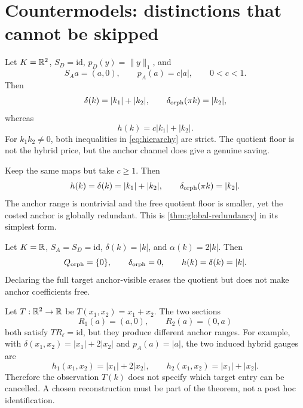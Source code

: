 \section{Countermodels: distinctions that cannot be skipped}
\label{sec:countermodels}

\begin{example}\label{ex:strict}
Let \(K=\mathbb R^2\), \(S_D=\mathrm{id}\), \(p_D(y)=\|y\|_1\), and
\[
 S_Aa=(a,0),
 \qquad
 p_A(a)=c|a|,
 \qquad 0<c<1.
\]
Then
\[
 \delta(k)=|k_1|+|k_2|,
 \qquad
 \delta_{\rm orph}(\pi k)=|k_2|,
\]
whereas
\[
 h(k)=c|k_1|+|k_2|.
\]
For \(k_1k_2\ne0\), both inequalities in
\eqref{eq:hierarchy} are strict.  The quotient floor is not the hybrid
price, but the anchor channel does give a genuine saving.
\end{example}

\begin{example}\label{ex:expensive}
Keep the same maps but take \(c\ge1\).  Then
\[
 h(k)=\delta(k)=|k_1|+|k_2|,
 \qquad
 \delta_{\rm orph}(\pi k)=|k_2|.
\]
The anchor range is nontrivial and the free quotient floor is smaller,
yet the costed anchor is globally redundant.  This is
\cref{thm:global-redundancy} in its simplest form.
\end{example}

\begin{example}
Let \(K=\mathbb R\), \(S_A=S_D=\mathrm{id}\),
\(\delta(k)=|k|\), and \(\alpha(k)=2|k|\).  Then
\[
 Q_{\rm orph}=\{0\},
 \qquad
 \delta_{\rm orph}=0,
 \qquad
 h(k)=\delta(k)=|k|.
\]
Declaring the full target anchor-visible erases the quotient but does
not make anchor coefficients free.
\end{example}

\begin{example}\label{ex:obs}
Let \(T:\mathbb R^2\to\mathbb R\) be \(T(x_1,x_2)=x_1+x_2\).  The two sections
\[
 R_1(a)=(a,0),
 \qquad
 R_2(a)=(0,a)
\]
both satisfy \(T R_\ell=\mathrm{id}\), but they produce different
anchor ranges.  For example, with
\(\delta(x_1,x_2)=|x_1|+2|x_2|\) and \(p_A(a)=|a|\), the two induced
hybrid gauges are
\[
 h_1(x_1,x_2)=|x_1|+2|x_2|,
 \qquad
 h_2(x_1,x_2)=|x_1|+|x_2|.
\]
Therefore the observation \(T(k)\) does not specify which target entry
can be cancelled.  A chosen reconstruction must be part of the
theorem, not a post hoc identification.
\end{example}

